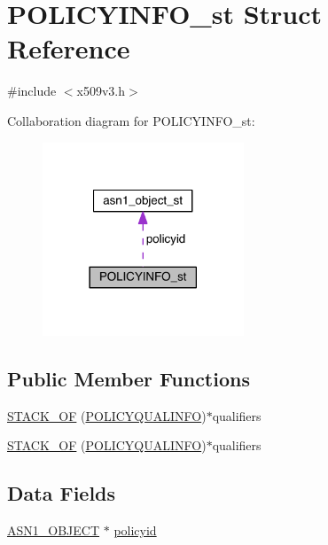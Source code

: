 \hypertarget{struct_p_o_l_i_c_y_i_n_f_o__st}{}\section{P\+O\+L\+I\+C\+Y\+I\+N\+F\+O\+\_\+st Struct Reference}
\label{struct_p_o_l_i_c_y_i_n_f_o__st}


{\ttfamily \#include $<$x509v3.\+h$>$}



Collaboration diagram for P\+O\+L\+I\+C\+Y\+I\+N\+F\+O\+\_\+st\+:\nopagebreak
\begin{figure}[H]
\begin{center}
\leavevmode
\includegraphics[width=170pt]{struct_p_o_l_i_c_y_i_n_f_o__st__coll__graph}
\end{center}
\end{figure}
\subsection*{Public Member Functions}
\begin{DoxyCompactItemize}
\item 
\hyperlink{struct_p_o_l_i_c_y_i_n_f_o__st_ac5e8c0234f9f9383b97863f008759219}{S\+T\+A\+C\+K\+\_\+\+OF} (\hyperlink{crypto_2x509v3_2x509v3_8h_a2f82c96293f325f0a4f9899e4c0e8426}{P\+O\+L\+I\+C\+Y\+Q\+U\+A\+L\+I\+N\+FO})$\ast$qualifiers
\item 
\hyperlink{struct_p_o_l_i_c_y_i_n_f_o__st_ac5e8c0234f9f9383b97863f008759219}{S\+T\+A\+C\+K\+\_\+\+OF} (\hyperlink{crypto_2x509v3_2x509v3_8h_a2f82c96293f325f0a4f9899e4c0e8426}{P\+O\+L\+I\+C\+Y\+Q\+U\+A\+L\+I\+N\+FO})$\ast$qualifiers
\end{DoxyCompactItemize}
\subsection*{Data Fields}
\begin{DoxyCompactItemize}
\item 
\hyperlink{crypto_2ossl__typ_8h_ae3fda0801e4c8e250087052bafb3ce2e}{A\+S\+N1\+\_\+\+O\+B\+J\+E\+CT} $\ast$ \hyperlink{struct_p_o_l_i_c_y_i_n_f_o__st_a3a32ff8d397b93a35f606e3ca8ced90d}{policyid}
\end{DoxyCompactItemize}


